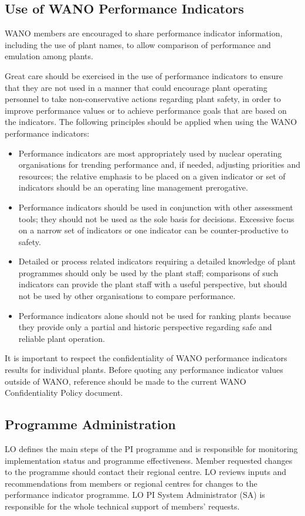 \subsection*{Use of WANO Performance Indicators}
WANO members are encouraged to share performance indicator
information, including the use of plant names, to allow comparison of
performance and emulation among plants.

Great care should be exercised in the use of performance indicators to
ensure that they are not used in a manner that could encourage plant
operating personnel to take non-conservative actions regarding plant
safety, in order to improve performance values or to achieve
performance goals that are based on the indicators. The following
principles should be applied when using the WANO performance
indicators:
\begin{itemize}
\item Performance indicators are most appropriately used by nuclear operating organisations for trending performance and, if needed, adjusting priorities and resources; the relative emphasis to be placed on a given indicator or set of indicators should be an operating line management prerogative.
\item Performance indicators should be used in conjunction with other assessment tools; they should not be used as the sole basis for decisions. Excessive focus on a narrow set of indicators or one indicator can be counter-productive to safety.
\item Detailed or process related indicators requiring a detailed knowledge of plant programmes should only be used by the plant staff; comparisons of such indicators can provide the plant staff with a useful perspective, but should not be used by other organisations to compare performance.
\item Performance indicators alone should not be used for ranking
  plants because they provide only a partial and historic perspective
  regarding safe and reliable plant operation.
\end{itemize}
It is important to respect the confidentiality of WANO performance indicators results for individual plants. Before quoting any performance indicator values outside of WANO, reference should be made to the current WANO Confidentiality Policy document.
\subsection*{Programme Administration}
LO defines the main steps of the PI programme and is responsible for
monitoring implementation status and programme effectiveness. Member
requested changes to the programme should contact their regional
centre. LO reviews inputs and recommendations from members or regional
centres for changes to the performance indicator programme. LO PI
System Administrator (SA) is responsible for the whole technical
support of members’ requests.

